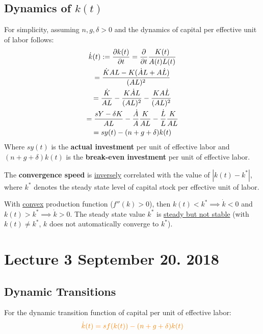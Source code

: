 \documentclass[11pt]{article}
\begin{document}
			\subsection{Dynamics of $k(t)$}
				\par For simplicity, assuming $n, g, \delta > 0$ and the dynamics of capital per effective unit of labor follows: 
				\begin{gather*}
					\dot{k}(t) := \frac{\partial{k(t)}}{\partial{t}} = \frac{\partial{}}{\partial{t}} \frac{K(t)}{A(t)L(t)} \\
					= \frac{\dot{K}AL - K(\dot{A}L + A\dot{L})}{(AL)^2} \\
					= \frac{\dot{K}}{AL} - \frac{K\dot{A}L}{(AL)^2} - \frac{K A\dot{L}}{(AL)^2} \\
					= \frac{sY - \delta K}{AL} - \frac{\dot{A}}{A}\frac{K}{AL} - \frac{\dot{L}}{L} \frac{K}{AL} \\
					= sy(t) - (n + g + \delta) k(t)
				\end{gather*}
				Where $s y(t)$ is the \textbf{actual investment} per unit of effective labor and $(n + g + \delta) k(t)$ is the \textbf{break-even investment} per unit of effective labor.
				
			\begin{remark}
				The \textbf{convergence speed} is \ul{inversely} correlated with the value of $| k(t) - k^* |$, where $k^*$ denotes the steady state level of capital stock per effective unit of labor.
			\end{remark}
			
			\begin{remark}
				With \ul{convex} production function ($f''(k) > 0$), then $k(t) < k^* \implies \dot{k} < 0$ and $k(t) > k^* \implies \dot{k} > 0$. The steady state value $k^*$ is \ul{steady but not stable} (with $k(t) \neq k^*$, $k$ does not automatically converge to $k^*$).
			\end{remark}
	
	\section{Lecture 3 September 20. 2018}
		\subsection{Dynamic Transitions}
			\begin{remark}
				For the dynamic transition function of capital per unit of effective labor:
				\begin{equation}
				\textcolor{orange}{
					\dot{k}(t) = sf(k(t)) - (n+g+\delta)k(t)
					}
				\end{equation}
			\end{remark}
\end{document}
